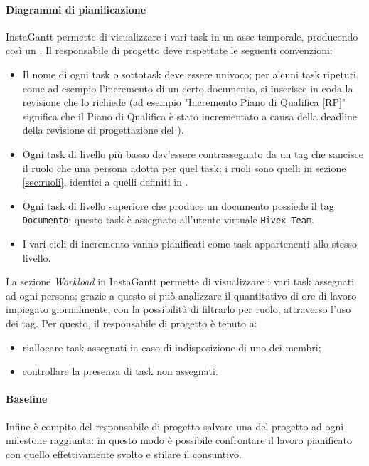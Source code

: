 \paragraph{Diagrammi di pianificazione}
InstaGantt permette di visualizzare i vari task in un asse temporale, producendo così un .
Il responsabile di progetto deve rispettate le seguenti convenzioni:
\begin{itemize}
	\item Il nome di ogni task o sottotask deve essere univoco; per alcuni task ripetuti, come ad esempio l'incremento di un certo documento, si inserisce in coda la revisione che lo richiede (ad esempio "Incremento Piano di Qualifica [RP]" significa che il Piano di Qualifica è stato incrementato a causa della deadline della revisione di progettazione del \TV).
	\item Ogni task di livello più basso dev'essere contrassegnato da un tag che sancisce il ruolo che una persona adotta per quel task; i ruoli sono quelli in sezione \ref{sec:ruoli}, identici a quelli definiti in \PdP.
	\item Ogni task di livello superiore che produce un documento possiede il tag \texttt{Documento}; questo task è assegnato all'utente virtuale \texttt{Hivex Team}.
	\item I vari cicli di incremento vanno pianificati come task appartenenti allo stesso livello.
\end{itemize}
La sezione \emph{Workload} in InstaGantt permette di visualizzare i vari task assegnati ad ogni persona; grazie a questo si può analizzare il quantitativo di ore di lavoro impiegato giornalmente, con la possibilità di filtrarlo per ruolo, attraverso l'uso dei tag. Per questo, il responsabile di progetto è tenuto a:
\begin{itemize}
	\item riallocare task assegnati in caso di indisposizione di uno dei membri;
	\item controllare la presenza di task non assegnati.
\end{itemize}

\paragraph{Baseline} Infine è compito del responsabile di progetto salvare una \emph{} del progetto ad ogni milestone raggiunta: in questo modo è possibile confrontare il lavoro pianificato con quello effettivamente svolto e stilare il consuntivo.


